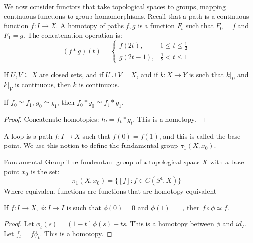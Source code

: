 \documentclass[crop=false,class=book,oneside]{standalone}
\begin{document}
        We now consider functors that take topological spaces to
        groups, mapping continuous functions to group homomorphisms.
        Recall that a path is a continuous function $f:I\rightarrow{X}$.
        A homotopy of paths $f,g$ is a function $F_{t}$ such that
        $F_{0}=f$ and $F_{1}=g$. The concatenation operation is:
        \begin{equation}
            (f*g)(t)=
            \begin{cases}
                f(2t),&0\leq{t}\leq\frac{1}{2}\\
                g(2t-1),&\frac{1}{2}<t\leq{1}
            \end{cases}
        \end{equation}
        \begin{theorem}
            If $U,V\subseteq{X}$ are closed sets, and if
            $U\cup{V}=X$, and if $k:X\rightarrow{Y}$ is such that
            $k|_{U}$ and $k|_{V}$ is continuous, then $k$ is continuous.
        \end{theorem}
        \begin{theorem}
            If $f_{0}\simeq{f}_{1}$, $g_{0}\simeq{g}_{1}$, then
            $f_{0}*g_{0}\simeq{f}_{1}*g_{1}$.
        \end{theorem}
        \begin{proof}
            Concatenate homotopies: $h_{t}=f_{t}*g_{t}$. This is a
            homotopy.
        \end{proof}
        A loop is a path $f:I\rightarrow{X}$ such that $f(0)=f(1)$, and
        this is called the base-point. We use this notion to define the
        fundamental group $\pi_{1}(X,x_{0})$.
        \begin{ldefinition}{Fundamental Group}
            The fundemtanl group of a topological space $X$ with a
            base point $x_{0}$ is the set:
            \begin{equation}
                \pi_{1}(X,x_{0})=\{[f]:f\in{C}(S^{1},X)\}
            \end{equation}
            Where equivalent functions are functions that are homotopy
            equivalent.
        \end{ldefinition}
        \begin{theorem}
            If $f:I\rightarrow{X}$, $\phi:I\rightarrow{I}$ is such that
            $\phi(0)=0$ and $\phi(1)=1$, then $f\circ\phi\simeq{f}$.
        \end{theorem}
        \begin{proof}
            Let $\phi_{t}(s)=(1-t)\phi(s)+ts$. This is a homotopy between
            $\phi$ and $id_{I}$. Let $f_{t}=f\phi_{t}$. This is a
            homotopy.
        \end{proof}
\end{document}
